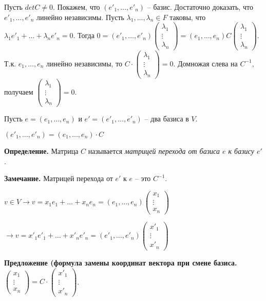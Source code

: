 Пусть $detC \neq 0$. Покажем, что $(e'_1, \dots, e'_n)$ -- базис. Достаточно доказать, что $e'_1, \dots, e'_n$ линейно независимы. Пусть $\lambda_1, \dots, \lambda_n \in F$ таковы, что $\lambda_1 e'_1 + \dots + \lambda_n e'_n = 0$. Тогда $0 = (e'_1, \dots, e'_n) \begin{pmatrix} \lambda_1 \\ \vdots \\ \lambda_n \end{pmatrix} = (e_1, \dots, e_n) C \begin{pmatrix} \lambda_1 \\ \vdots \\ \lambda_n \end{pmatrix}$. Т.к. $e_1, \dots, e_n$ линейно независимы, то $C \cdot \begin{pmatrix} \lambda_1 \\ \vdots \\ \lambda_n \end{pmatrix} = 0$. Домножая слева на $C^{-1}$, получаем $\begin{pmatrix} \lambda_1 \\ \vdots \\ \lambda_n \end{pmatrix} = 0$.

\bigskip
Пусть $e = (e_1, \dots, e_n)$ и $e' = (e'_1, \dots, e'_n)$ -- два базиса в $V$.

$(e'_1, \dots, e'_n) = (e_1, \dots, e_n) \cdot C$

\bigskip
\textbf{Определение.} Матрица $C$ называется \textit{матрицей перехода от базиса $e$ к базису $e'$}.

\bigskip
\textbf{Замечание.} Матрицей перехода от $e'$ к $e$ -- это $C^{-1}$. 

\bigskip
$v \in V \rightarrow v = x_1 e_1 + \dots + x_n e_n = (e_1, \dots, e_n) \begin{pmatrix} x_1 \\ \vdots \\ x_n \end{pmatrix}$

$\rightarrow v = x'_1 e'_1 + \dots + x'_n e'_n = (e'_1, \dots, e'_n) \begin{pmatrix} x'_1 \\ \vdots \\ x'_n \end{pmatrix}$

\textbf{Предложение (формула замены координат вектора при смене базиса.} $\begin{pmatrix} x_1 \\ \vdots \\ x_n \end{pmatrix} = C \cdot \begin{pmatrix} x'_1 \\ \vdots \\ x'_n \end{pmatrix}$.

